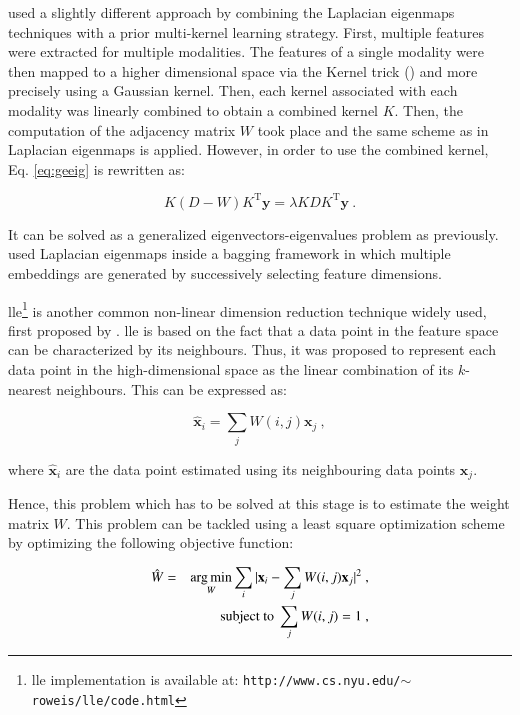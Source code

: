 \cite{Tiwari2009,Tiwari2013} used a slightly different approach by combining the Laplacian eigenmaps techniques with a prior multi-kernel learning strategy. First, multiple features were extracted for multiple modalities. The features of a single modality were then mapped to a higher dimensional space via the Kernel trick (\cite{Aizerman1964}) and more precisely using a Gaussian kernel. Then, each kernel associated with each modality was linearly combined to obtain a combined kernel $K$. Then, the computation of the adjacency matrix $W$ took place and the same scheme as in Laplacian eigenmaps is applied. However, in order to use the combined kernel, Eq. \eqref{eq:geeig} is rewritten as:

\begin{equation}
	K (D-W) K^{\text{T}} \mathbf{y} = \lambda K D K^{\text{T}} \mathbf{y} \ .
	\label{eq:sesmik}
\end{equation}

It can be solved as a generalized eigenvectors-eigenvalues problem as previously. \cite{Viswanath2011} used Laplacian eigenmaps inside a bagging framework in which multiple embeddings are generated by successively selecting feature dimensions.

\ac{lle}\footnote{\ac{lle} implementation is available at: \texttt{http://www.cs.nyu.edu/\allowbreak $\sim$roweis/lle/code.html}} is another common non-linear dimension reduction technique widely used, first proposed by \cite{Roweis2000}. \ac{lle} is based on the fact that a data point in the feature space can be characterized by its neighbours. Thus, it was proposed to represent each data point in the high-dimensional space as the linear combination of its $k$-nearest neighbours. This can be expressed as:

\begin{equation}
	\hat{\mathbf{x}}_i = \sum_j W(i,j) \mathbf{x}_j \ ,
	\label{eq:lincomlle}
\end{equation}

\noindent where $\hat{\mathbf{x}}_i$ are the data point estimated using its neighbouring data points $\mathbf{x}_j$.

Hence, this problem which has to be solved at this stage is to estimate the weight matrix $W$. This problem can be tackled using a least square optimization scheme by optimizing the following objective function:

\begin{eqnarray}
	\hat{W} & = & \operatorname*{arg\,min}_{W} \sum_i | \mathbf{x}_i - \sum_j W(i,j)\mathbf{x}_j |^{2} \ , \label{eq:lslle} \\
	&& \text{subject to } \sum_j W(i,j) = 1 \ , \nonumber
\end{eqnarray}

